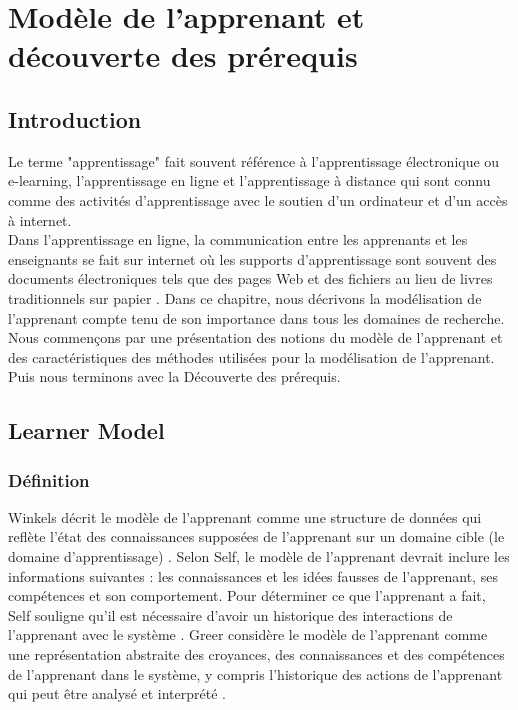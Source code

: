 \chapter{Modèle de l'apprenant et découverte des prérequis} 
\label{chap2}
\minitoc
\thispagestyle{empty}
\newpage
\section{Introduction}
Le terme "apprentissage" fait souvent référence à l'apprentissage électronique ou e-learning, l’apprentissage en ligne et l'apprentissage à distance qui sont connu comme des activités d'apprentissage avec le soutien d'un ordinateur et d'un accès à internet. \\
Dans l'apprentissage en ligne, la communication entre les apprenants et les enseignants se fait sur internet où les supports d'apprentissage sont souvent des documents électroniques tels que des pages Web et des fichiers au lieu de livres traditionnels sur papier \cite{learner_model__adaptive_learning}. Dans ce chapitre, nous décrivons la modélisation de l'apprenant compte tenu de son importance dans tous les domaines de recherche. Nous commençons par une présentation des notions du modèle de l'apprenant et des caractéristiques des méthodes utilisées pour la modélisation de l'apprenant. Puis nous terminons avec la Découverte des prérequis.

\section{Learner Model}

\subsection{Définition}
Winkels décrit le modèle de l'apprenant comme une structure de données qui reflète l'état des connaissances supposées de l'apprenant sur un domaine cible (le domaine d'apprentissage) \cite{user_modelling_help_systems}. Selon Self, le modèle de l'apprenant devrait inclure les informations suivantes : les connaissances et les idées fausses de l'apprenant, ses compétences et son comportement. Pour déterminer ce que l’apprenant a fait, Self souligne qu’il est nécessaire d’avoir un historique des interactions de l’apprenant avec le système \cite{user_learner_modeling_workbench}.
Greer considère le modèle de l'apprenant comme une représentation abstraite des croyances, des connaissances et des compétences de l'apprenant dans le système, y compris l'historique des actions de l'apprenant qui peut être analysé et interprété \cite{psycho_oncology}.

